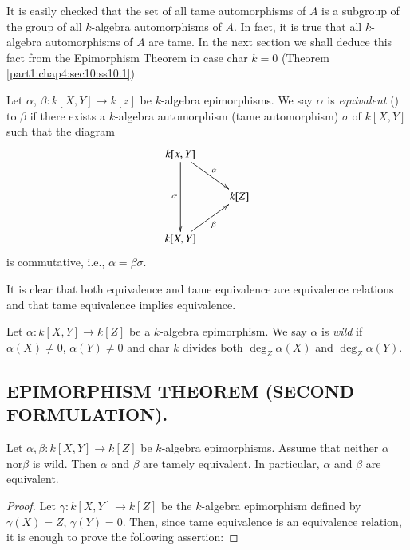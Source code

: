 \begin{remark}\label{part1:chap4:sec9:rem9.15}
  It is easily checked that the set of all tame automorphisms of $A$
  is a subgroup of the group of all $k$-algebra automorphisms of
  $A$. In fact, it is true that all $k$-algebra automorphisms of $A$
  are tame. In the next section we shall deduce this fact from the
  Epimorphism Theorem in case char $k=0$ (Theorem
  \ref{part1:chap4:sec10:ss10.1}) 
\end{remark}

\begin{defi}\label{part1:chap4:sec9:def9.16}
Let $\alpha$, $\beta : k [X, Y] \to k [z]$ be $k$-algebra epimorphisms. We say $\alpha$ is  {\em equivalent} () to $\beta$ if there exists a $k$-algebra automorphism (\resp  tame automorphism) $\sigma $ of $k[X, Y]$ such that the diagram
\[
\xymatrix{ k[x, Y] \ar[dd]_{\sigma} \ar[rd]^{\alpha} & \\
& k[Z]\\
k[X, Y]\ar[ru]_{\beta} & }
\]
is commutative, i.e., $\alpha=\beta \sigma$.
\end{defi}

\begin{remark}\label{part1:chap4:sec9:rem9.17}
  It is clear that both equivalence and tame equivalence are equivalence relations and that tame equivalence implies equivalence.
\end{remark}

\begin{defi}\label{part1:chap4:sec9:def9.18}
  Let $\alpha : k[X, Y] \to k [Z]$ be a $k$-algebra epimorphism. We say $\alpha$ is {\em wild} if $\alpha (X) \neq 0$, $\alpha (Y) \neq 0$ and char $k$ divides both $\deg_Z \alpha (X)$ and $\deg_Z \alpha (Y)$.
\end{defi}

\setcounter{subsection}{18}

\subsection{\textbf{EPIMORPHISM THEOREM (SECOND FORMULATION).}}\label{part1:chap4:sec9:ss9.19}

Let $\alpha, \beta: k[X, Y] \to k [Z]$ be $k$-algebra epimorphisms. Assume that neither $\alpha$ nor\pageoriginale $\beta$ is wild. Then $\alpha$ and $\beta$ are tamely equivalent. In particular, $\alpha$ and $\beta$ are equivalent.

\begin{proof}
  Let $\gamma: k [X, Y]\to k[Z]$ be the $k$-algebra  epimorphism defined by $\gamma(X)= Z$, $\gamma(Y)=0$. Then, since tame equivalence is an equivalence relation, it is enough to prove the following assertion:
\end{proof}

